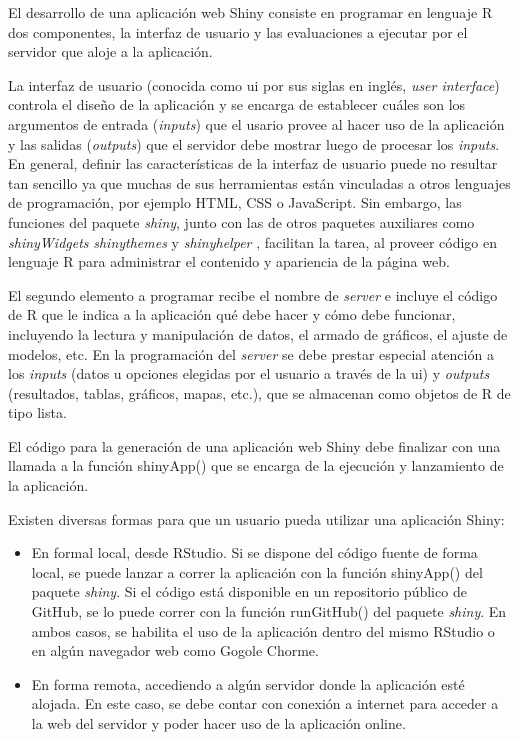 El desarrollo de una aplicación web Shiny consiste en programar en lenguaje R dos componentes, la interfaz de usuario y las evaluaciones a ejecutar por el servidor que aloje a la aplicación.

La interfaz de usuario (conocida como ui por sus siglas en inglés, \emph{user interface}) controla el diseño de la aplicación y se encarga de establecer cuáles son los argumentos de entrada (\emph{inputs}) que el usario provee al hacer uso de la aplicación y las salidas (\emph{outputs}) que el servidor debe mostrar luego de procesar los \emph{inputs}. En general, definir las características de la interfaz de usuario puede no resultar tan sencillo ya que muchas de sus herramientas están vinculadas a otros lenguajes de programación, por ejemplo HTML, CSS o JavaScript. Sin embargo, las funciones del paquete \emph{shiny}, junto con las de otros paquetes auxiliares como \emph{shinyWidgets} \citep{Perrieretal2020} \emph{shinythemes} \citep{Chang2018} y \emph{shinyhelper} \citep{Mason2019}, facilitan la tarea, al proveer código en lenguaje R para administrar el contenido y apariencia de la página web.

El segundo elemento a programar recibe el nombre de \emph{server} e incluye el código de R que le indica a la aplicación qué debe hacer y cómo debe funcionar, incluyendo la lectura y manipulación de datos, el armado de gráficos, el ajuste de modelos, etc. En la programación del \emph{server} se debe prestar especial atención a los \emph{inputs} (datos u opciones elegidas por el usuario a través de la ui) y \emph{outputs} (resultados, tablas, gráficos, mapas, etc.), que se almacenan como objetos de R de tipo lista.

El código para la generación de una aplicación web Shiny debe finalizar con una llamada a la función \textcolor{fandango}{shinyApp()} que se encarga de la ejecución y lanzamiento de la aplicación.

Existen diversas formas para que un usuario pueda utilizar una aplicación Shiny:

\begin{itemize}

\item En formal local, desde RStudio. Si se dispone del código fuente de forma local, se puede lanzar a correr la aplicación con la función \textcolor{fandango}{shinyApp()} del paquete \emph{shiny}. Si el código está disponible en un repositorio público de GitHub, se lo puede correr con la función \textcolor{fandango}{runGitHub()} del paquete \emph{shiny}. En ambos casos, se habilita el uso de la aplicación dentro del mismo RStudio o en algún navegador web como Gogole Chorme.

\item En forma remota, accediendo a algún servidor donde la aplicación esté alojada. En este caso, se debe contar con conexión a internet para acceder a la web del servidor y poder hacer uso de la aplicación online.

\end{itemize}





